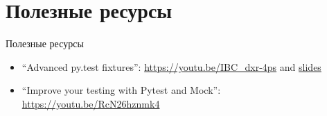 \documentclass{beamer}
\begin{document}
\section{Полезные ресурсы}
\begin{frame}[fragile]{Полезные ресурсы}
	\begin{itemize}
	\item ``Advanced py.test fixtures'':
		\url{https://youtu.be/IBC_dxr-4ps} and
		\href{http://devork.be/talks/advanced-fixtures/advfix.html}{slides}
	\item ``Improve your testing with Pytest and Mock'':
		\url{https://youtu.be/RcN26hznmk4}
	\end{itemize}
\end{frame}
\end{document}
